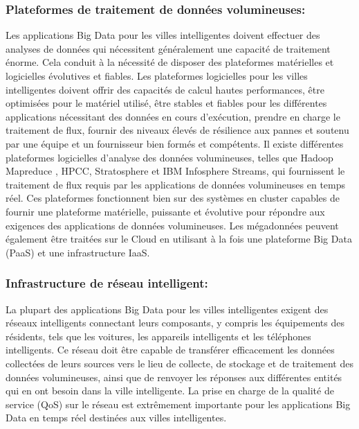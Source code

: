 \documentclass[french, a4paper, 12pt]{report}
\begin{document}
\subsubsection{Plateformes de traitement de données volumineuses:}
Les applications Big Data pour les villes intelligentes doivent effectuer des analyses de données qui nécessitent généralement une capacité de traitement énorme. Cela conduit à la nécessité de disposer des plateformes matérielles et logicielles évolutives et fiables. Les plateformes logicielles pour les villes intelligentes doivent offrir des capacités de calcul hautes performances, être optimisées pour le matériel utilisé, être stables et fiables pour les différentes applications nécessitant des données en cours d'exécution, prendre en charge le traitement de flux, fournir des niveaux élevés de résilience aux pannes et soutenu par une équipe et un fournisseur bien formés et compétents. Il existe différentes plateformes logicielles d'analyse des données volumineuses, telles que Hadoop Mapreduce , HPCC, Stratosphere et IBM Infosphere Streams, qui fournissent le traitement de flux requis par les applications de données volumineuses en temps réel. Ces plateformes fonctionnent bien sur des systèmes en cluster capables de fournir une plateforme matérielle, puissante et évolutive pour répondre aux exigences des applications de données volumineuses. Les mégadonnées peuvent également être traitées sur le Cloud en utilisant à la fois une plateforme Big Data (PaaS) et une infrastructure IaaS.\\
\subsubsection{Infrastructure de réseau intelligent:}

La plupart des applications Big Data pour les villes intelligentes exigent des réseaux intelligents connectant leurs composants, y compris les équipements des résidents, tels que les voitures, les appareils intelligents et les téléphones intelligents. Ce réseau doit être capable de transférer efficacement les données collectées de leurs sources vers le lieu de collecte, de stockage et de traitement des données volumineuses, ainsi que de renvoyer les réponses aux différentes entités qui en ont besoin dans la ville intelligente. La prise en charge de la qualité de service (QoS) sur le réseau est extrêmement importante pour les applications Big Data en temps réel destinées aux villes intelligentes. \\
\end{document}
